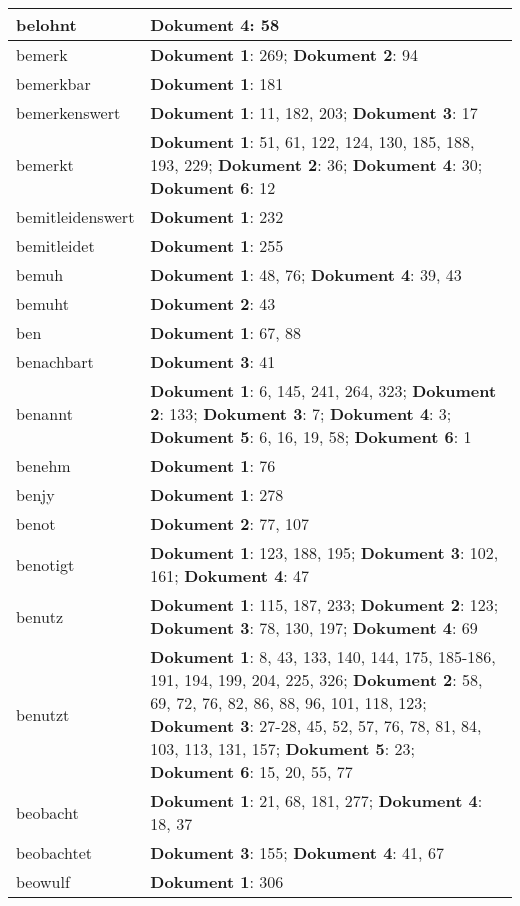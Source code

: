 \documentclass[a5paper]{article}
\begin{document}
\begin{longtable}[l]{|l|p{3in}|}
\hline
belohnt & \textbf{Dokument 4}: 58 \\
\hline
bemerk & \textbf{Dokument 1}: 269; \textbf{Dokument 2}: 94 \\
\hline
bemerkbar & \textbf{Dokument 1}: 181 \\
\hline
bemerkenswert & \textbf{Dokument 1}: 11, 182, 203; \textbf{Dokument 3}: 17 \\
\hline
bemerkt & \textbf{Dokument 1}: 51, 61, 122, 124, 130, 185, 188, 193, 229; \textbf{Dokument 2}: 36; \textbf{Dokument 4}: 30; \textbf{Dokument 6}: 12 \\
\hline
bemitleidenswert & \textbf{Dokument 1}: 232 \\
\hline
bemitleidet & \textbf{Dokument 1}: 255 \\
\hline
bemuh & \textbf{Dokument 1}: 48, 76; \textbf{Dokument 4}: 39, 43 \\
\hline
bemuht & \textbf{Dokument 2}: 43 \\
\hline
ben & \textbf{Dokument 1}: 67, 88 \\
\hline
benachbart & \textbf{Dokument 3}: 41 \\
\hline
benannt & \textbf{Dokument 1}: 6, 145, 241, 264, 323; \textbf{Dokument 2}: 133; \textbf{Dokument 3}: 7; \textbf{Dokument 4}: 3; \textbf{Dokument 5}: 6, 16, 19, 58; \textbf{Dokument 6}: 1 \\
\hline
benehm & \textbf{Dokument 1}: 76 \\
\hline
benjy & \textbf{Dokument 1}: 278 \\
\hline
benot & \textbf{Dokument 2}: 77, 107 \\
\hline
benotigt & \textbf{Dokument 1}: 123, 188, 195; \textbf{Dokument 3}: 102, 161; \textbf{Dokument 4}: 47 \\
\hline
benutz & \textbf{Dokument 1}: 115, 187, 233; \textbf{Dokument 2}: 123; \textbf{Dokument 3}: 78, 130, 197; \textbf{Dokument 4}: 69 \\
\hline
benutzt & \textbf{Dokument 1}: 8, 43, 133, 140, 144, 175, 185-186, 191, 194, 199, 204, 225, 326; \textbf{Dokument 2}: 58, 69, 72, 76, 82, 86, 88, 96, 101, 118, 123; \textbf{Dokument 3}: 27-28, 45, 52, 57, 76, 78, 81, 84, 103, 113, 131, 157; \textbf{Dokument 5}: 23; \textbf{Dokument 6}: 15, 20, 55, 77 \\
\hline
beobacht & \textbf{Dokument 1}: 21, 68, 181, 277; \textbf{Dokument 4}: 18, 37 \\
\hline
beobachtet & \textbf{Dokument 3}: 155; \textbf{Dokument 4}: 41, 67 \\
\hline
beowulf & \textbf{Dokument 1}: 306 \\

\end{longtable}
\end{document}

